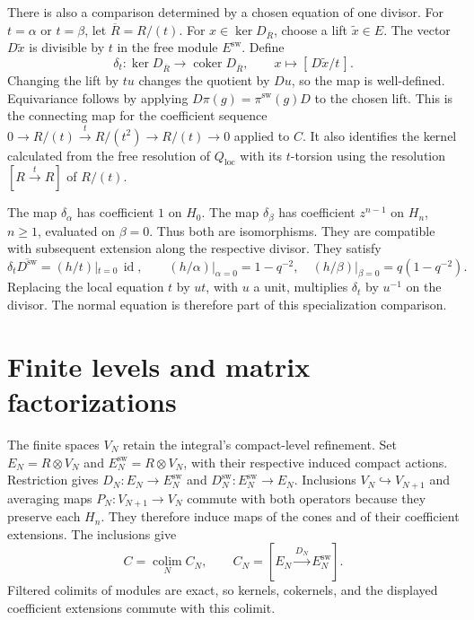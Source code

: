 There is also a comparison determined by a chosen equation of one divisor.
For $t=\alpha$ or $t=\beta$, let $\overline R=R/(t)$.
For $x\in\ker D_{\overline R}$, choose a lift $\widetilde x\in E$.
The vector $D\widetilde x$ is divisible by $t$ in the free module $E^\mathrm{sw}$.
Define
\begin{equation}\label{v4-arith:w10-d:local:eq:bockstein}
 \delta_t:\ker D_{\overline R}\longrightarrow\operatorname{coker} D_{\overline R},
 \qquad x\longmapsto[\,D\widetilde x/t\,].
\end{equation}
Changing the lift by $tu$ changes the quotient by $Du$, so the map is well-defined.
Equivariance follows by applying $D\pi(g)=\pi^\mathrm{sw}(g)D$ to the chosen lift.
This is the connecting map for the coefficient sequence
$0\to R/(t)\xrightarrow{t}R/(t^2)\to R/(t)\to0$ applied to $C$.
It also identifies the kernel calculated from the free resolution of $Q_{\mathrm{loc}}$
with its $t$-torsion using the resolution $[R\xrightarrow{t}R]$ of $R/(t)$.

The map $\delta_\alpha$ has coefficient $1$ on $H_0$.
The map $\delta_\beta$ has coefficient $z^{n-1}$ on $H_n$, $n\ge1$, evaluated on $\beta=0$.
Thus both are isomorphisms.
They are compatible with subsequent extension along the respective divisor.
They satisfy
\[
 \delta_t\overline {D^\mathrm{sw}}=(h/t)|_{t=0}\,\operatorname{id},
 \qquad
 (h/\alpha)|_{\alpha=0}=1-q^{-2},\quad
 (h/\beta)|_{\beta=0}=q(1-q^{-2}).
\]
Replacing the local equation $t$ by $ut$, with $u$ a unit, multiplies $\delta_t$ by $u^{-1}$ on the divisor.
The normal equation is therefore part of this specialization comparison.

\section{Finite levels and matrix factorizations}

The finite spaces $V_N$ retain the integral's compact-level refinement.
Set $E_N=R\otimes V_N$ and $E_N^\mathrm{sw}=R\otimes V_N$, with their respective induced compact actions.
Restriction gives $D_N:E_N\to E_N^\mathrm{sw}$ and $D_N^\mathrm{sw}:E_N^\mathrm{sw}\to E_N$.
Inclusions $V_N\hookrightarrow V_{N+1}$ and averaging maps $P_N:V_{N+1}\to V_N$
commute with both operators because they preserve each $H_n$.
They therefore induce maps of the cones and of their coefficient extensions.
The inclusions give
\[
 C=\operatorname*{colim}_N C_N,\qquad C_N=[E_N\xrightarrow{D_N}E_N^\mathrm{sw}].
\]
Filtered colimits of modules are exact, so kernels, cokernels, and the displayed coefficient extensions commute with this colimit.

